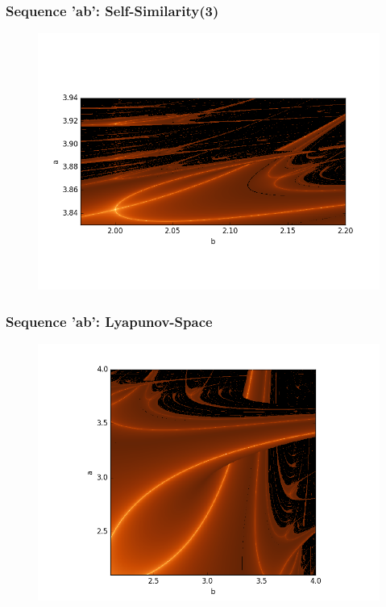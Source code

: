\documentclass[ignorenonframetext]{beamer}
\begin{document}
\begin{frame}
\frametitle{Sequence 'ab': Self-Similarity(3)}
\begin{figure}[htbp]
\includegraphics[scale = 0.5]{pictures/ab_selfsim_3.png}
\end{figure}
\end{frame}

\begin{frame}
\frametitle{Sequence 'ab': Lyapunov-Space}
\begin{figure}[htbp]
\vspace*{5pt}
\includegraphics[scale = 0.5]{pictures/ab_lyapunov-space.png}
\end{figure}
\end{frame}
\end{document}
